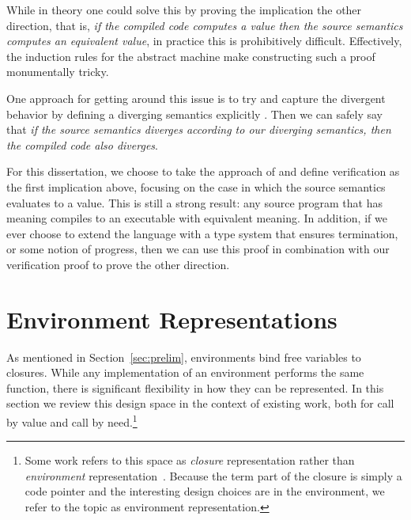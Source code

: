 While in theory one could solve this by proving the implication the other
direction, that is, \emph{if the compiled code computes a value then the source
semantics computes an equivalent value}, in practice this is prohibitively
difficult. Effectively, the induction rules for the abstract machine make
constructing such a proof monumentally tricky. 

One approach for getting around this issue is to try and capture the divergent
behavior by defining a diverging semantics explicitly \cite{functionalbigstep}.
Then we can safely say that \emph{if the source semantics diverges according to
our diverging semantics, then the compiled code also diverges}. 

For this dissertation, we choose to take the approach of \cite{chlipala2007certified}
and define verification as the first implication above, focusing on the case in
which the source semantics evaluates to a value. This is still a strong
result: any source program that has meaning compiles to an executable with
equivalent meaning. In addition, if we ever choose to extend the language with a
type system that ensures termination, or some notion of progress, then we can
use this proof in combination with our verification proof to prove the other
direction. 

\section{Environment Representations} \label{sec:env}

As mentioned in Section~\ref{sec:prelim}, environments bind free variables to
closures. While any implementation of an environment performs the same function,
there is significant flexibility in how they can be represented. In this section
we review this design space in the context of existing work, both for call by
value and call by need.\footnote{Some work refers to this space as
\emph{closure} representation rather than \emph{environment}
representation~\cite{shao1994space,appel1988optimizing}.  Because the term part
of the closure is simply a code pointer and the interesting design choices are
in the environment, we refer to the topic as environment representation.}

